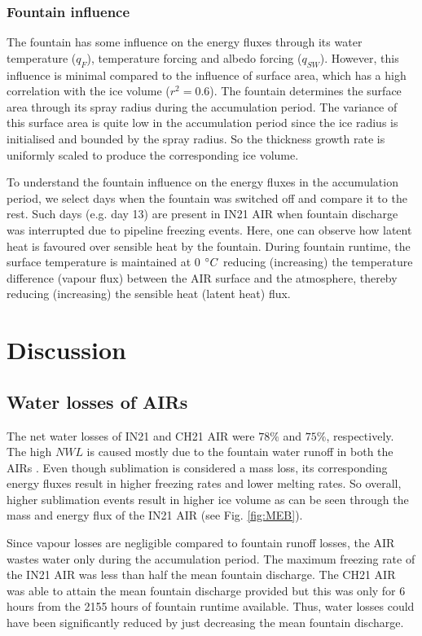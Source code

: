 \documentclass[utf8]{frontiersSCNS} %
\begin{document}
\subsubsection{Fountain influence}

The fountain has some influence on the energy fluxes through its water temperature ($q_{F}$), temperature
forcing and albedo forcing ($q_{SW}$). However, this influence is minimal compared to the influence
of surface area, which has a high correlation with the ice volume ($r^2=0.6$). The fountain determines the
surface area through its spray radius during the accumulation period. The variance of this surface area is quite
low in the accumulation period since the ice radius is initialised and bounded by the spray radius. So the
thickness growth rate is uniformly scaled to produce the corresponding ice volume.

To understand the fountain influence on the energy fluxes in the accumulation period, we select days when the
fountain was switched off and compare it to the rest. Such days (e.g. day 13) are present in IN21 AIR when
fountain discharge was interrupted due to pipeline freezing events. Here, one can observe how latent heat is
favoured over sensible heat by the fountain. During fountain runtime, the surface temperature is maintained at 0
$\degree C$ reducing (increasing) the temperature difference (vapour flux) between the AIR surface and the
atmosphere, thereby reducing (increasing) the sensible heat (latent heat) flux.

\section{Discussion}

\subsection{Water losses of AIRs}

The net water losses of IN21 and CH21 AIR were $78\%$ and $75\%$, respectively. The high $NWL$ is caused mostly
due to the fountain water runoff in both the AIRs . Even though sublimation is considered a mass loss, its
corresponding energy fluxes result in higher freezing rates and lower melting rates. So overall, higher
sublimation events result in higher ice volume as can be seen through the mass and energy flux of the IN21 AIR
(see Fig.  \ref{fig:MEB}).

Since vapour losses are negligible compared to fountain runoff losses, the AIR wastes water only during the
accumulation period. The maximum freezing rate of the IN21 AIR was less than half the mean fountain discharge. The
CH21 AIR was able to attain the mean fountain discharge provided but this was only for 6 hours from the 2155
hours of fountain runtime available. Thus, water losses could have been significantly reduced by just decreasing
the mean fountain discharge.
\end{document}
